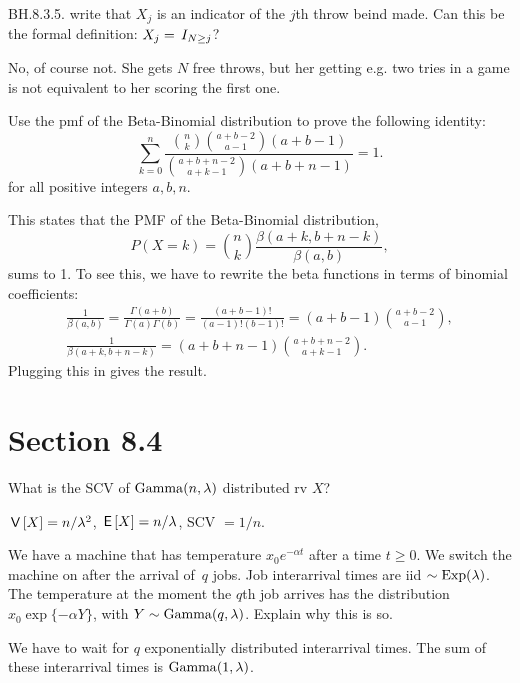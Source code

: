 \begin{exercise}
BH.8.3.5. write that $X_j$ is an indicator of the $j$th throw beind made. Can this be the formal definition: $X_j = \,I_{N\geq j}$?
\begin{solution}
No, of course not. She gets $N$ free throws, but her getting e.g. two tries in a game is not equivalent to her scoring the first one.
\end{solution}
\end{exercise}


\begin{exercise}
Use the pmf of the Beta-Binomial distribution to prove the following identity:
\begin{equation*}
   \sum_{k=0}^n \frac{\binom{n}{k}\binom{a+b-2}{a-1}  (a+b-1) }{\binom{a+b+n-2}{a+k-1}(a+b+n-1)} = 1.
\end{equation*}
for all positive integers $a, b, n$.
\begin{solution}
This  states that the PMF of the Beta-Binomial distribution, $$P(X=k) = \binom{n}{k} \frac{\beta(a+k,b+n-k)}{\beta(a,b)},$$ sums to 1. To see this, we have to rewrite the beta functions in terms of binomial coefficients:
\begin{align*}
   \frac{1}{\beta(a,b)} = \frac{\Gamma(a+b)}{\Gamma(a)\Gamma(b)} = \frac{(a+b-1)!}{(a-1)! (b-1)!} = (a+b-1) \binom{a+b-2}{a-1}, \\
   \frac{1}{\beta(a+k,b+n-k)}  = (a+b+n-1) \binom{a+b+n-2}{a+k-1}.
\end{align*}
Plugging this in gives the result.
\end{solution}
\end{exercise}



\section{Section 8.4}
\label{sec:section-8.4}

\begin{exercise}
What is the SCV of $\mathrm{Gamma}(n, \lambda)$ distributed rv $X$?
\begin{solution}
$\,\mathsf{V}\left[X\right] = n/\lambda^{2}$, $\,\mathsf{E}\left[X\right] = n/\lambda$, SCV $=1/n$.
\end{solution}
\end{exercise}

\begin{exercise}
We have a machine that has temperature $x_0e^{-\alpha t}$ after a time $t\geq 0$. We switch the machine on after the arrival of~$q$ jobs. Job interarrival times are iid $\sim\mathrm{Exp}(\lambda)$. The temperature at the moment the $q$th job arrives has the distribution $x_0\exp\{-\alpha Y\}$, with $Y\sim \mathrm{Gamma}(q, \lambda)$. Explain why this is so.
\begin{solution}
We have to wait for $q$ exponentially distributed interarrival times. The sum of these interarrival times is $\mathrm{Gamma}(1, \lambda)$.
\end{solution}
\end{exercise}



